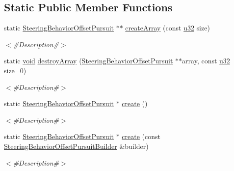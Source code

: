 \subsection*{Static Public Member Functions}
\begin{DoxyCompactItemize}
\item 
static \mbox{\hyperlink{classnjli_1_1_steering_behavior_offset_pursuit}{Steering\+Behavior\+Offset\+Pursuit}} $\ast$$\ast$ \mbox{\hyperlink{classnjli_1_1_steering_behavior_offset_pursuit_a8f03204a3a873f88951a7c508fa9a399}{create\+Array}} (const \mbox{\hyperlink{_util_8h_a10e94b422ef0c20dcdec20d31a1f5049}{u32}} size)
\begin{DoxyCompactList}\small\item\em $<$\#\+Description\#$>$ \end{DoxyCompactList}\item 
static \mbox{\hyperlink{_thread_8h_af1e856da2e658414cb2456cb6f7ebc66}{void}} \mbox{\hyperlink{classnjli_1_1_steering_behavior_offset_pursuit_a3947ab185513f8d580139a61d53f1a05}{destroy\+Array}} (\mbox{\hyperlink{classnjli_1_1_steering_behavior_offset_pursuit}{Steering\+Behavior\+Offset\+Pursuit}} $\ast$$\ast$array, const \mbox{\hyperlink{_util_8h_a10e94b422ef0c20dcdec20d31a1f5049}{u32}} size=0)
\begin{DoxyCompactList}\small\item\em $<$\#\+Description\#$>$ \end{DoxyCompactList}\item 
static \mbox{\hyperlink{classnjli_1_1_steering_behavior_offset_pursuit}{Steering\+Behavior\+Offset\+Pursuit}} $\ast$ \mbox{\hyperlink{classnjli_1_1_steering_behavior_offset_pursuit_a90ed1a4648b504840f9666c35c83f7af}{create}} ()
\begin{DoxyCompactList}\small\item\em $<$\#\+Description\#$>$ \end{DoxyCompactList}\item 
static \mbox{\hyperlink{classnjli_1_1_steering_behavior_offset_pursuit}{Steering\+Behavior\+Offset\+Pursuit}} $\ast$ \mbox{\hyperlink{classnjli_1_1_steering_behavior_offset_pursuit_a0b3f8be430c7cb2f5b82e80c0f3c06d0}{create}} (const \mbox{\hyperlink{classnjli_1_1_steering_behavior_offset_pursuit_builder}{Steering\+Behavior\+Offset\+Pursuit\+Builder}} \&builder)
\begin{DoxyCompactList}\small\item\em $<$\#\+Description\#$>$ \end{DoxyCompactList}\item 

\end{DoxyCompactItemize}
